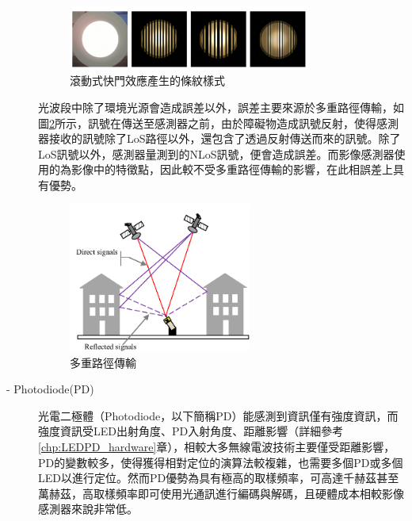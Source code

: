 \begin{description}
                    \begin{figure}[htpb]
                        \centering
                        \includegraphics[width=8cm]{ch2pic/rolling_shutter_case.png}
                        \caption{滾動式快門效應產生的條紋樣式\cite{pic:rolling_shutter_case}}
                        \label{pic:rolling_shutter_case}
                    \end{figure}

                    \qquad
                    光波段中除了環境光源會造成誤差以外，誤差主要來源於多重路徑傳輸，如圖\ref{pic:multipath}所示，訊號在傳送至感測器之前，由於障礙物造成訊號反射，使得感測器接收的訊號除了LoS路徑以外，還包含了透過反射傳送而來的訊號。除了LoS訊號以外，感測器量測到的NLoS訊號，便會造成誤差。而影像感測器使用的為影像中的特徵點，因此較不受多重路徑傳輸的影響，在此相誤差上具有優勢。

                    \begin{figure}[htpb]
                        \centering
                        \includegraphics[width=6cm]{ch2pic/multipath.png}
                        \caption{多重路徑傳輸\cite{pic:multipath}}
                        \label{pic:multipath}
                    \end{figure}

                    \item[- Photodiode(PD)]\hfill
                    
                    \qquad
                    光電二極體（Photodiode，以下簡稱PD）能感測到資訊僅有強度資訊，而強度資訊受LED出射角度、PD入射角度、距離影響（詳細參考\ref{chp:LEDPD_hardware}章），相較大多無線電波技術主要僅受距離影響，PD的變數較多，使得獲得相對定位的演算法較複雜，也需要多個PD或多個LED以進行定位。然而PD優勢為具有極高的取樣頻率，可高達千赫茲甚至萬赫茲，高取樣頻率即可使用光通訊進行編碼與解碼，且硬體成本相較影像感測器來說非常低。


\end{description}
